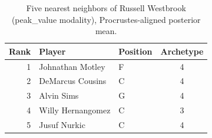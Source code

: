 \begin{table}[htbp]
  \centering\small
  \begin{tabular}{rllc}
    \toprule
    Rank & Player & Position & Archetype \\
    \midrule
    1 & Johnathan Motley & F & 4 \\
    2 & DeMarcus Cousins & C & 4 \\
    3 & Alvin Sims & G & 4 \\
    4 & Willy Hernangomez & C & 3 \\
    5 & Jusuf Nurkic & C & 4 \\
    \bottomrule
  \end{tabular}
  \caption{Five nearest neighbors of Russell Westbrook (peak_value modality), Procrustes-aligned posterior mean.}
  \label{tab:Russell_Westbrook_neighbors_peak_value}
\end{table}

